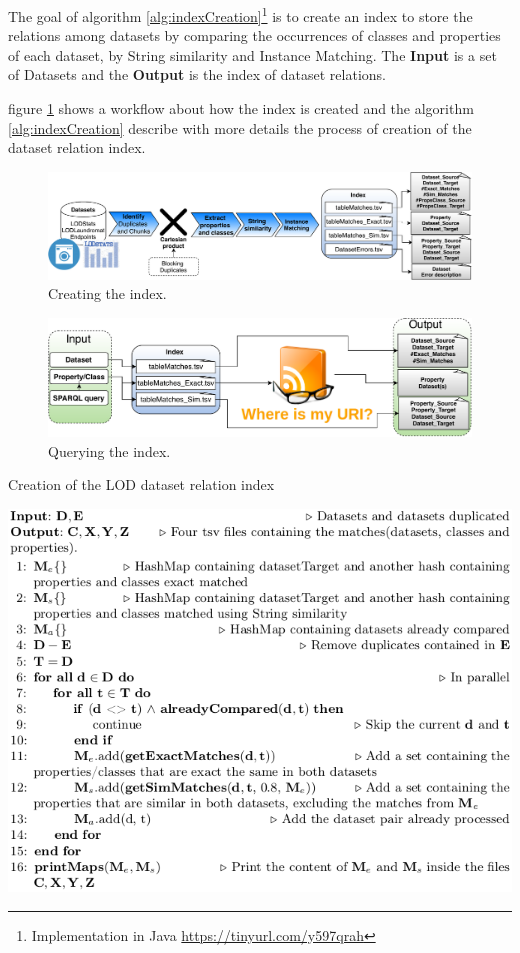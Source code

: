 The goal of algorithm \ref{alg:indexCreation}\footnote{Implementation in Java \url{https://tinyurl.com/y597qrah}} is to create an index to store the relations among datasets by comparing the occurrences of classes and properties of each dataset, by String similarity and Instance Matching. The \textbf{Input} is a set of Datasets and the \textbf{Output} is the index of dataset relations.

figure \ref{fig:create} shows a workflow about how the index is created and the algorithm \ref{alg:indexCreation} describe with more details the process of creation of the dataset relation index.

\begin{figure}[htb] 
	\centering
	\includegraphics[width=\linewidth]{img/createIndex.pdf}
	\caption{Creating the index.}
	\label{fig:create}
\end{figure}

\begin{figure}[htb] 
	\centering
	\includegraphics[width=\linewidth]{img/queryIndex.pdf}
	\caption{Querying the index.}
	\label{fig:queryIndex}
\end{figure}

\begin{algorithm} [htb] 
	\caption{Creation of the LOD dataset relation index}
	\label{alg:indexCreation}
    \includegraphics[width=\linewidth]{sections/img/algReLOD.png}
\end{algorithm}

